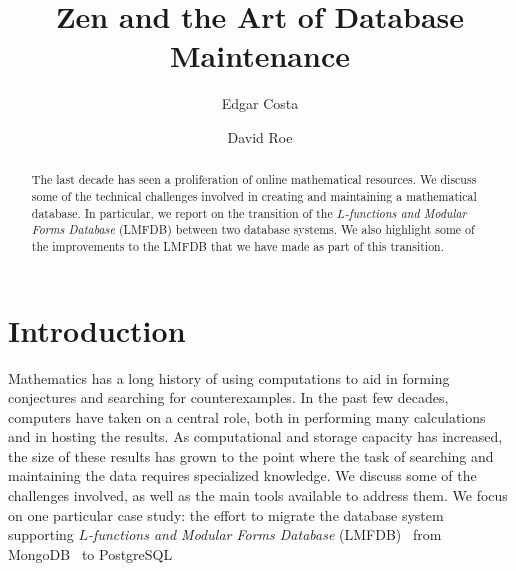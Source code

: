 \documentclass{amsart}
\begin{document}
\title{Zen and the Art of Database Maintenance}




\author{Edgar Costa}
\address{Department of Mathematics, Massachusetts Institute of Technology, Cambridge, MA 02139, USA}
\author{David Roe}
\address{Department of Mathematics, Massachusetts Institute of Technology, Cambridge, MA 02139, USA}

\begin{abstract}
The last decade has seen a proliferation of online mathematical resources.
We discuss some of the technical challenges involved in creating and maintaining a mathematical database.
In particular, we report on the transition of the \emph{$L$-functions and Modular Forms Database} (LMFDB) between two database systems.
We also highlight some of the improvements to the LMFDB that we have made as part of this transition.
\end{abstract}

\maketitle

\section{Introduction}

Mathematics has a long history of using computations to aid in forming conjectures and searching for counterexamples.
In the past few decades, computers have taken on a central role, both in performing many calculations and in hosting the results.
As computational and storage capacity has increased, the size of these results has grown to the point where the task of searching and maintaining the data requires specialized knowledge.
We discuss some of the challenges involved, as well as the main tools available to address them.
We focus on one particular case study: the effort to migrate the database system supporting \emph{$L$-functions and Modular Forms Database} (LMFDB)~\cite{lmfdb} from MongoDB~\cite{mongo} to PostgreSQL~\cite{postgres}
\end{document}
